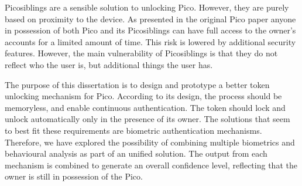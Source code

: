 Picosiblings are a sensible solution to unlocking Pico. However, they are purely based on proximity to the device. As presented in the original Pico paper \cite{stajano2011pico} anyone in possession of both Pico and its Picosiblings can have full access to the owner's accounts for a limited amount of time. This risk is lowered by additional security features. However, the main vulnerability of Picosiblings is that they do not reflect who the user is, but additional things the user has.

The purpose of this dissertation is to design and prototype a better token unlocking mechanism for Pico. According to its design, the process should be memoryless, and enable continuous authentication. The token should lock and unlock automatically only in the presence of its owner. The solutions that seem to best fit these requirements are biometric authentication mechanisms. Therefore, we have explored the possibility of combining multiple biometrics and behavioural analysis as part of an unified solution. The output from each mechanism is combined to generate an overall confidence level, reflecting that the owner is still in possession of the Pico.

